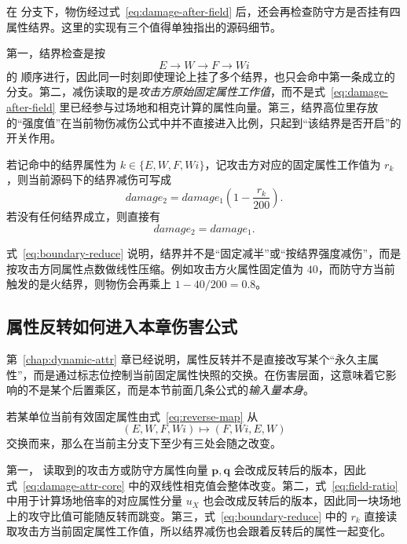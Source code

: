 在  分支下，物伤经过式~\eqref{eq:damage-after-field} 后，还会再检查防守方是否挂有四属性结界。这里的实现有三个值得单独指出的源码细节。

第一，结界检查是按
\begin{equation}
    E \rightarrow W \rightarrow F \rightarrow Wi
\end{equation}
的  顺序进行，因此同一时刻即使理论上挂了多个结界，也只会命中第一条成立的分支。第二，减伤读取的是\emph{攻击方原始固定属性工作值}，而不是式~\eqref{eq:damage-after-field} 里已经参与过场地和相克计算的属性向量。第三，结界高位里存放的“强度值”在当前物伤减伤公式中并不直接进入比例，只起到“该结界是否开启”的开关作用。

若记命中的结界属性为 $k\in\{E,W,F,Wi\}$，记攻击方对应的固定属性工作值为 $r_k$，则当前源码下的结界减伤可写成
\begin{equation}
    damage_2 = damage_1\left(1-\frac{r_k}{200}\right).
    \label{eq:boundary-reduce}
\end{equation}
若没有任何结界成立，则直接有
\begin{equation}
    damage_2 = damage_1.
\end{equation}

式~\eqref{eq:boundary-reduce} 说明，结界并不是“固定减半”或“按结界强度减伤”，而是按攻击方同属性点数做线性压缩。例如攻击方火属性固定值为 $40$，而防守方当前触发的是火结界，则物伤会再乘上 $1-40/200=0.8$。

\subsection{属性反转如何进入本章伤害公式}

第~\ref{chap:dynamic-attr} 章已经说明，属性反转并不是直接改写某个“永久主属性”，而是通过标志位控制当前固定属性快照的交换。在伤害层面，这意味着它影响的不是某个后置乘区，而是本节前面几条公式的\emph{输入量本身}。

若某单位当前有效固定属性由式~\eqref{eq:reverse-map} 从
\begin{equation}
    (E,W,F,Wi) \longmapsto (F,Wi,E,W)
\end{equation}
交换而来，那么在当前主分支下至少有三处会随之改变。

第一， 读取到的攻击方或防守方属性向量 $\bm{p},\bm{q}$ 会改成反转后的版本，因此式~\eqref{eq:damage-attr-core} 中的双线性相克值会整体改变。第二，式~\eqref{eq:field-ratio} 中用于计算场地倍率的对应属性分量 $u_X$ 也会改成反转后的版本，因此同一块场地上的攻守比值可能随反转而跳变。第三，式~\eqref{eq:boundary-reduce} 中的 $r_k$ 直接读取攻击方当前固定属性工作值，所以结界减伤也会跟着反转后的属性一起变化。

